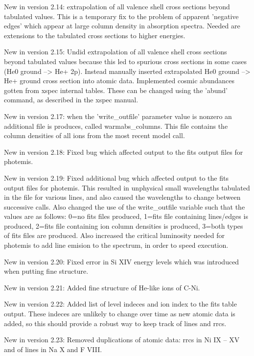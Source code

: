 New in version 2.14:  extrapolation of all valence shell cross sections beyond 
tabulated values.  This is a temporary fix to the problem of apparent 
'negative edges' which appear at large column density in absorption spectra.
Needed are extensions to the tabulated cross sections to higher energies.

New in version 2.15:  Undid extrapolation of all valence shell cross 
sections beyond tabulated values because this led to spurious 
cross sections in some cases (He0 ground --> He+ 2p).  Instead manually
inserted extrapolated He0 ground --> He+ ground cross section 
into atomic data.  Implemented cosmic abundances gotten from xspec 
internal tables.  These can be changed using the 'abund' command, 
as described in the xspec manual.

New in version 2.17:  when the 'write\_outfile' parameter value is 
nonzero an additional file is produces, called warmabs\_columns.  This 
file contains the column densities of all ions from the most 
recent model call.

New in version 2.18:  Fixed bug which affected output to the fits output 
files for photemis.

New in version 2.19:  Fixed additional bug which affected output to the 
fits output files for photemis.  This resulted in unphysical small wavelengths
tabulated in the file for various lines, and also caused the wavelengths 
to change between successive calls.  Also changed the use of the 
write\_outfile variable such that the values are as follows:  0=no fits files
produced, 1=fits file containing lines/edges is produced, 2=fits file 
containing ion column densities is produced, 3=both types of fits files 
are produced.  Also increased the critical luminosity needed for photemis
to add line emision to the spectrum, in order to speed execution.

New in version 2.20:  Fixed error in Si XIV energy levels which was introduced
when putting fine structure.

New in version 2.21:  Added fine structure of He-like ions of C-Ni.

New in version 2.22:  Added list of level indeces and ion index to the fits 
table output.  These indeces are unlikely to change over time as new atomic 
data is added, so this should provide a robust way to keep track of 
lines and rrcs.

New in version 2.23:  Removed duplications of atomic data: rrcs in 
Ni IX -- XV and of lines in Na X and F VIII.

